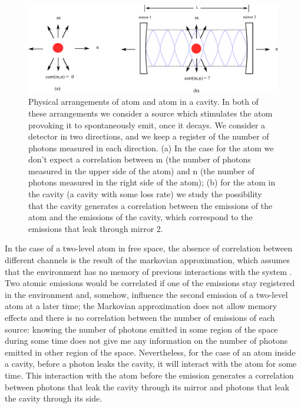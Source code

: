 \documentclass[conference]{IEEEtran}
\begin{document}
\begin{center}
\begin{figure}\label{asa}
\begin{center}
\includegraphics[scale = 0.65]{newimagepaper.pdf}
\caption{\small{Physical arrangements of atom and atom in a cavity. In
    both of these arrangements we consider a source which stimulates
    the atom provoking it to spontaneously emit, once it decays. We
    consider a detector in two directions, and we keep a register of
    the number of photons measured in each direction. (a) In the case
    for the atom we don't expect a correlation between m (the number
    of photons measured in the upper side of the atom) and n (the
    number of photons measured in the right side of the atom); (b) for
    the atom in the cavity (a cavity with some loss rate) we study the
    possibility that the cavity generates a correlation between the
    emissions of the atom and the emissions of the cavity, which
    correspond to the emissions that leak through mirror
    2.}} 
\end{center}
\end{figure}
\end{center}


In the case of a two-level atom in free space, the absence of
correlation between different channels is the result of the markovian
approximation, which assumes that the environment has no memory of
previous interactions with the system \cite{daley2014quantum}. Two
atomic emissions would be correlated if one of the emissions stay
registered in the environment and, somehow, influence the second
emission of a two-level atom at a later time; the Markovian
approximation does not allow memory effects and there is no
correlation between the number of emissions of each source: knowing
the number of photons emitted in some region of the space during some
time does not give me any information on the number of photons emitted
in other region of the space. Nevertheless, for the case of an atom
inside a cavity, before a photon leaks the cavity, it will interact
with the atom for some time. This interaction with the atom before the
emission generates a correlation between photons that leak the cavity
through its mirror and photons that leak the cavity through its side.
\end{document}

